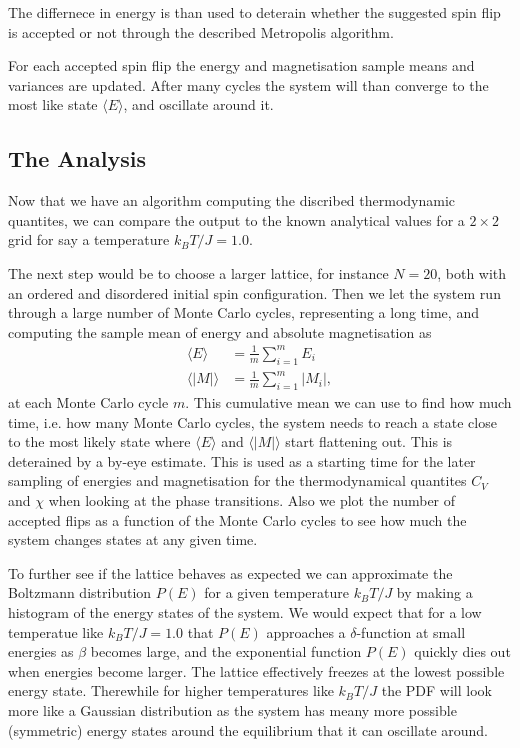 \documentclass[twocolumn]{aastex62}
\begin{document}
The differnece in energy is than used to deterain whether the suggested spin
flip is accepted or not through the described Metropolis algorithm.

For each accepted spin flip the energy and magnetisation sample means and variances are
updated. After many cycles the system will than converge to the most like state
$\langle E\rangle$, and oscillate around it.


\subsection{The Analysis}\label{subsec:analysis}
Now that we have an algorithm computing the discribed thermodynamic quantites,
we can compare the output to the known analytical values for a $2\times 2$ grid
for say a temperature $k_BT/J = 1.0$.

The next step would be to choose a larger lattice, for instance $N = 20$, both
with an ordered and disordered initial spin configuration. Then we let the
system run through a large number of Monte Carlo cycles, representing a long
time, and computing the sample mean of energy and absolute magnetisation as
\begin{align}
	\langle E\rangle &= \frac{1}{m}\sum_{i = 1}^m E_i\\
	\langle |M|\rangle &= \frac{1}{m}\sum_{i = 1}^m |M_i|,
\end{align}
at each Monte Carlo cycle $m$. This cumulative mean we can use to find how much
time, i.e. how many Monte Carlo cycles, the system needs to reach a state close
to the most likely state where $\langle E \rangle$ and $\langle |M|\rangle$
start flattening out. This is deterained by a by-eye estimate. This is used as a
starting time for the later sampling of energies and magnetisation for
the thermodynamical quantites $C_V$ and $\chi$ when looking at the phase
transitions.
Also we plot the number of accepted flips as a function of the Monte Carlo
cycles to see how much the system changes states at any given time.

To further see if the lattice behaves as expected we can approximate the
Boltzmann distribution $P(E)$ for a given temperature $k_BT/J$ by making a
histogram of the energy states of the system. We would expect that for a low
temperatue like $k_BT / J = 1.0$ that $P(E)$ approaches a $\delta$-function at
small energies as
$\beta$ becomes large, and the exponential function $P(E)$ quickly dies out when
energies become larger. The lattice effectively freezes at the lowest possible
energy state. Therewhile for higher temperatures like $k_BT/J$ the PDF
will look more like a Gaussian distribution as the system has meany more
possible (symmetric) energy states around the equilibrium that it can oscillate
around.
\end{document}
